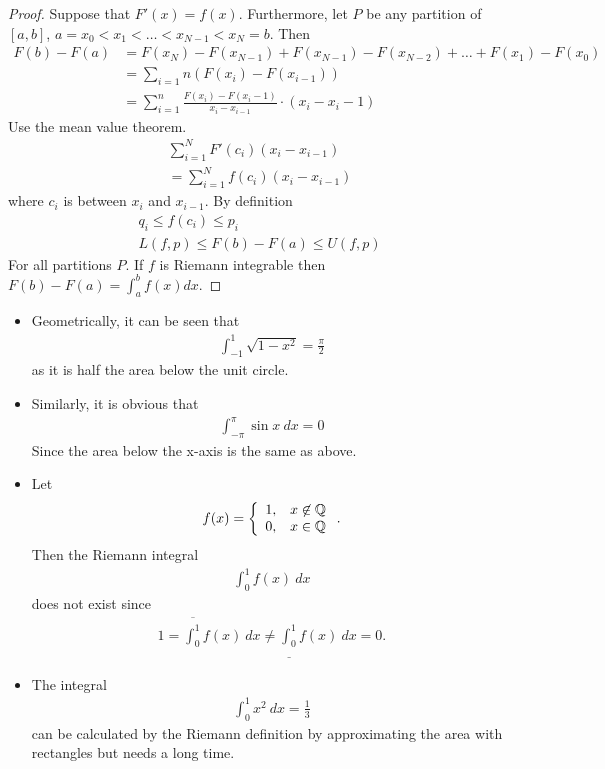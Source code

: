 \begin{proof}
	Suppose that $F'(x) = f(x)$. Furthermore, let $P$ be any partition of $[a,b]$, $a=x_0 < x_1 < \dots < x_{N-1} < x_N = b$. Then
	\begin{align*}
	F(b) - F(a) & = F(x_N) - F(x_{N-1}) + F(x_{N-1}) - F(x_{N-2}) + \dots + F(x_1) - F(x_0) \\
	& = \sum_{i=1}n (F(x_i) - F(x_{i-1})) \\
	& = \sum_{i=1}^n \frac{F(x_i) - F(x_i-1)}{x_i-x_{i-1}} \cdot (x_i - x_i-1)
	\end{align*}
	Use the mean value theorem.
	\begin{align*}
	\sum_{i=1}^N F'(c_i) (x_i - x_{i-1}) \\
	= \sum_{i=1}^N f(c_i) (x_i - x_{i-1})
	\end{align*}
	where $c_i$ is between $x_i$ and $x_{i-1}$. By definition
	\begin{align*}
	q_i \le f(c_i) \le p_i \\
	L(f,p) \le F(b) - F(a) \le U(f,p)
	\end{align*}
	For all partitions $P$. If $f$ is Riemann integrable then $F(b) - F(a) = \int_a^b f(x) dx$.
\end{proof}

\begin{ex}
	\begin{itemize}
		\item
		Geometrically, it can be seen that
		\begin{align*}
		\int_{-1}^1 \sqrt{1-x^2} = \frac \pi 2
		\end{align*}
		as it is half the area below the unit circle.
		\item
		Similarly, it is obvious that
		\begin{align*}
		\int_{-\pi}^\pi \sin x~ dx = 0
		\end{align*}
		Since the area below the x-axis is the same as above.
		\item
		Let
		\begin{align*}
		f(x) = \left\{ \begin{array}{ll}
		1, & x \not \in \mathbb Q \\
		0, & x \in \mathbb Q
		\end{array}
		\right. .
		\end{align*}
		Then the Riemann integral
		\begin{align*}
		\int_0^1 f(x) ~dx
		\end{align*}
		does not exist since
		\begin{align*}
		1 = \overline{\int_0^1} f(x) ~ dx \neq \underline{\int_0^1} f(x) ~ dx = 0.
		\end{align*}
		\item
		The integral
		\begin{align*}
		\int_0^1 x^2 ~dx = \frac 1 3
		\end{align*}
		can be calculated by the Riemann definition by approximating the area with rectangles but needs a long time.
	\end{itemize}
\end{ex}

